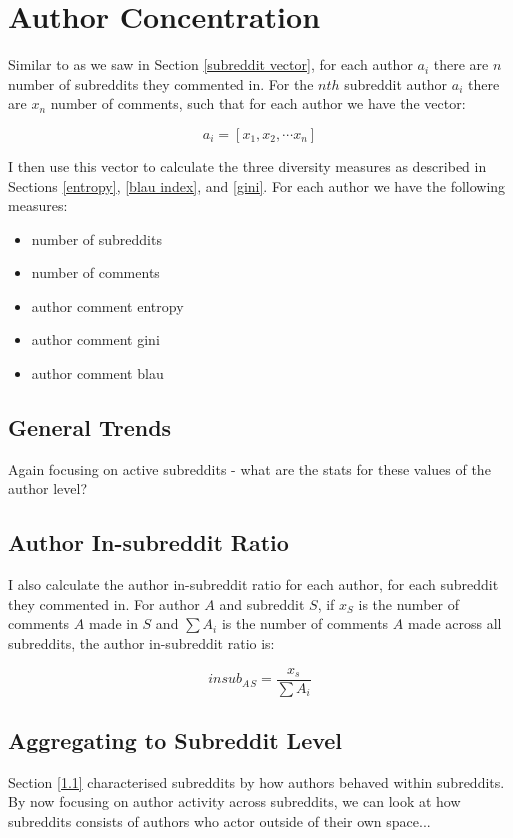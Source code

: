 \documentclass{article}
\begin{document}
\section{Author Concentration}

Similar to as we saw in Section \ref{subreddit vector}, for each author $a_i$ there are $n$ number of subreddits they commented in. For the $nth$ subreddit author $a_i$ there are $x_n$ number of comments, such that for each author we have the vector:

$$a_i = [x_1, x_2, \cdots x_n]$$

I then use this vector to calculate the three diversity measures as described in Sections \ref{entropy}, \ref{blau index}, and \ref{gini}. For each author we have the following measures:

\begin{itemize}
    \item number of subreddits
    \item number of comments
    \item author comment entropy
    \item author comment gini
    \item author comment blau
\end{itemize}


\subsection{General Trends}
Again focusing on active subreddits - what are the stats for these values of the author level?




\subsection{Author In-subreddit Ratio}
I also calculate the author in-subreddit ratio for each author, for each subreddit they commented in.
For author $A$ and subreddit $S$, if $x_S$ is the number of comments $A$ made in $S$ and $\sum A_i$ is the number of comments $A$ made across all subreddits, the author in-subreddit ratio is:

$$insub_A{}_S = \frac{x_s}{\sum A_i}$$

\subsection{Aggregating to Subreddit Level}
Section \ref{1.1} characterised subreddits by how authors behaved within subreddits. By now focusing on author activity across subreddits, we can look at how subreddits consists of authors who actor outside of their own space...
\end{document}
